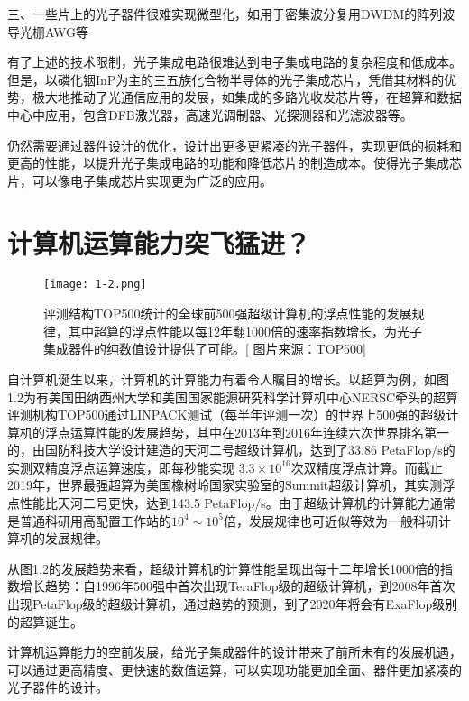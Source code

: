 三、一些片上的光子器件很难实现微型化，如用于密集波分复用DWDM的阵列波导光栅AWG等

有了上述的技术限制，光子集成电路很难达到电子集成电路的复杂程度和低成本。但是，以磷化铟InP为主的三五族化合物半导体的光子集成芯片，凭借其材料的优势，极大地推动了光通信应用的发展，如集成的多路光收发芯片等，在超算和数据中心中应用，包含DFB激光器，高速光调制器、光探测器和光滤波器等。\cite{Kish2011Current}

仍然需要通过器件设计的优化，设计出更多更紧凑的光子器件，实现更低的损耗和更高的性能，以提升光子集成电路的功能和降低芯片的制造成本。使得光子集成芯片，可以像电子集成芯片实现更为广泛的应用。\cite{Reed2008Silicon}


\section{计算机运算能力突飞猛进？}

\begin{figure}[!htbp]
    \centering
    \texttt{[image: 1-2.png]}
    \caption{评测结构TOP500统计的全球前500强超级计算机的浮点性能的发展规律，其中超算的浮点性能以每12年翻1000倍的速率指数增长，为光子集成器件的纯数值设计提供了可能。[{\color[HTML]{0000FF} 图片来源：TOP500}]}
    \label{fig:1-2}
\end{figure}
自计算机诞生以来，计算机的计算能力有着令人瞩目的增长。以超算为例，如图1.2为有美国田纳西州大学和美国国家能源研究科学计算机中心NERSC牵头的超算评测机构TOP500通过LINPACK测试（每半年评测一次）的世界上500强的超级计算机的浮点运算性能的发展趋势，其中在2013年到2016年连续六次世界排名第一的，由国防科技大学设计建造的天河二号超级计算机，达到了33.86 PetaFlop/s的实测双精度浮点运算速度，即每秒能实现 $3.3\times10^{16}$次双精度浮点计算。而截止2019年，世界最强超算为美国橡树岭国家实验室的Summit超级计算机，其实测浮点性能比天河二号更快，达到143.5 PetaFlop/s。由于超级计算机的计算能力通常是普通科研用高配置工作站的$10^4\sim 10^5$倍，发展规律也可近似等效为一般科研计算机的发展规律。\cite{top500}

从图1.2的发展趋势来看，超级计算机的计算性能呈现出每十二年增长1000倍的指数增长趋势：自1996年500强中首次出现TeraFlop级的超级计算机，到2008年首次出现PetaFlop级的超级计算机，通过趋势的预测，到了2020年将会有ExaFlop级别的超算诞生。

计算机运算能力的空前发展，给光子集成器件的设计带来了前所未有的发展机遇，可以通过更高精度、更快速的数值运算，可以实现功能更加全面、器件更加紧凑的光子器件的设计。

